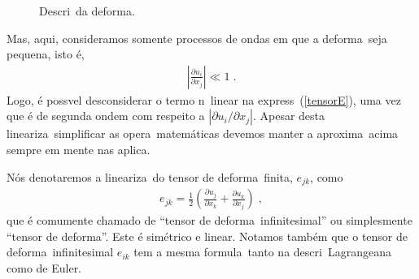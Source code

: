 \begin{figure}[!tb]
\centering
\caption{Descri\cao\ da deforma\cao.}
\label{fig:tensor-deformacao}
\end{figure}
Mas, aqui, consideramos somente processos de ondas
em que a deforma\cao\ seja pequena, isto \'e,
\begin{eqnarray}
\left|\frac{\partial u_i}{\partial x_j}\right| \ll 1 \; .
\label{def_peq}
\end{eqnarray}
Logo, \'e poss\ih vel desconsiderar o termo n\ao\ linear
na express\ao\ (\ref{tensorE}), uma vez que \'e de segunda
ondem com respeito a  $|\partial u_i / \partial x_j|$.
Apesar desta lineariza\cao\ simplificar as opera\coes\
matem\'aticas devemos manter a aproxima\cao\ acima sempre
em mente nas aplica\coes.

N\'os denotaremos a lineariza\cao\ do tensor de
deforma\cao\ finita, $e_{jk}$, como
\begin{eqnarray} \label{td}
e_{jk} = \frac{1}{2} \left( \frac{\partial u_j}
{\partial x_k} +\frac{\partial u_k}{\partial x_j}\right)
\; ,
\end{eqnarray}
que \'e comumente chamado de ``tensor de deforma\cao\
infinitesimal'' ou simplesmente ``tensor de deforma\cao''.
Este \'e sim\'etrico e linear. Notamos tamb\'em que o
tensor de deforma\cao\ infinitesimal $e_{ik}$ tem a mesma formula\cao\
tanto na descri\cao\ Lagrangeana como de Euler.

